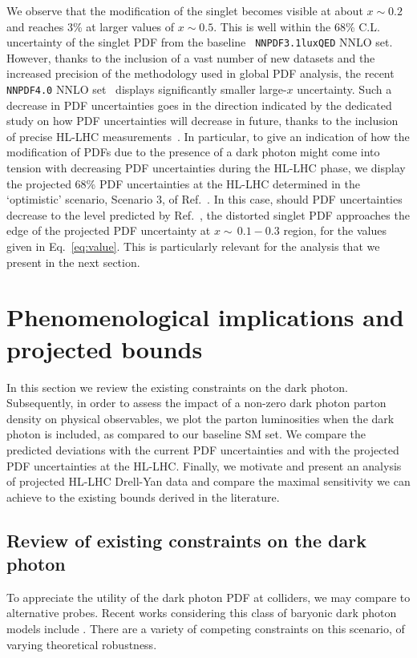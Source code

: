 \documentclass[withindex,glossary]{cam-thesis}
\begin{document}
We observe
that the modification of the singlet becomes visible at about $x\sim 0.2$ and
reaches 3\% at larger values of $x\sim 0.5$. This is well within the
68\% C.L. uncertainty of the singlet PDF from the baseline {\tt
  NNPDF3.1luxQED} NNLO set. However, thanks to the inclusion of a vast
number of new datasets and the increased precision of the methodology
used in global PDF analysis, the recent {\tt NNPDF4.0} NNLO
set~\cite{NNPDF:2021njg} 
displays significantly smaller large-$x$ uncertainty. Such a
decrease in PDF uncertainties goes in the direction indicated by the
dedicated study on how PDF
uncertainties will decrease in future, thanks to the inclusion of precise
HL-LHC measurements~\cite{Khalek:2018}. In particular, to give an indication
of how the modification of PDFs due to the presence of a dark photon might
come into tension with decreasing PDF uncertainties during the HL-LHC phase, 
we display the projected 68\% PDF uncertainties at
the HL-LHC determined in the `optimistic' scenario, Scenario 3, of Ref.~\cite{Khalek:2018}.
In this case, should PDF uncertainties decrease to the
level predicted by Ref.~\cite{Khalek:2018}, the distorted singlet PDF approaches the edge of the
projected PDF uncertainty at $x\sim \,0.1-0.3$ region, for the values given
in Eq.~\eqref{eq:value}. This is particularly relevant for the
analysis that we present in the next section. 




\newpage
\section{Phenomenological implications and projected bounds}
\label{sec:dark_pheno}

In this section we review the existing constraints on the dark photon.
Subsequently, in order to assess the impact of a non-zero dark photon
parton density on physical observables, we plot the parton luminosities
when the dark photon is included, as compared to our baseline SM set. 
We compare the predicted deviations with the current PDF
uncertainties and with the projected PDF uncertainties at the HL-LHC.
Finally, we motivate and present an analysis of projected HL-LHC Drell-Yan data 
and compare the maximal sensitivity we can achieve to the existing
bounds derived in the literature.

\subsection{Review of existing constraints on the dark photon}
\label{sec:existingconstraints}
To appreciate the utility of the dark photon PDF at colliders, we may compare to alternative probes.  Recent works considering this class of baryonic dark photon models include \cite{Dobrescu:2014fca,Dror:2017ehi,Ismail:2017fgq,Dror:2018wfl,Ilten:2018crw,Dobrescu:2021vak}.  There are a variety of competing constraints on this scenario, of varying theoretical robustness.
\end{document}
